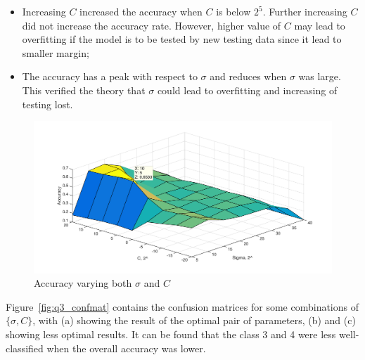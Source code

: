 \documentclass[10pt,twocolumn,letterpaper]{article}
\begin{document}
\begin{itemize}
\item Increasing $C$ increased the accuracy when $C$ is below $2^5$. Further increasing $C$ did not increase the accuracy rate. However, higher value of $C$ may lead to overfitting if the model is to be tested by new testing data since it lead to smaller margin;
\item The accuracy has a peak with respect to $\sigma$ and reduces when $\sigma$ was large. This verified the theory that $\sigma$ could lead to overfitting and increasing of testing lost.
\end{itemize}

\begin{figure}
	\begin{center}
		\includegraphics[width=1\linewidth]{q3_ovo3D}
		\caption{Accuracy varying both $\sigma$ and $C$}
		\label{fig:q3_ovo3D}
	\end{center}
\end{figure}


Figure~\ref{fig:q3_confmat} contains the confusion matrices for some combinations of $\{\sigma, C \}$, with (a) showing the result of the optimal pair of parameters, (b) and (c) showing less optimal results. It can be found that the class 3 and 4 were less well-classified when the overall accuracy was lower. 
\end{document}
